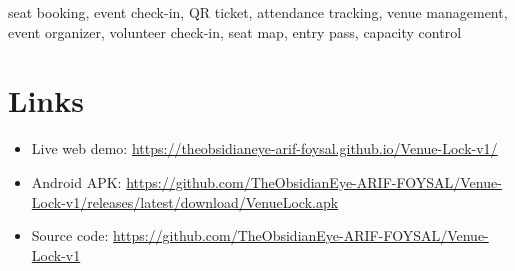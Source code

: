 \documentclass[11pt,a4paper]{article}
\begin{document}
seat booking, event check-in, QR ticket, attendance tracking, venue
management, event organizer, volunteer check-in, seat map, entry pass,
capacity control

\section{Links}

\begin{itemize}[leftmargin=1.5em]
    \item Live web demo:
        \url{https://theobsidianeye-arif-foysal.github.io/Venue-Lock-v1/}
    \item Android APK:
        \url{https://github.com/TheObsidianEye-ARIF-FOYSAL/Venue-Lock-v1/releases/latest/download/VenueLock.apk}
    \item Source code:
        \url{https://github.com/TheObsidianEye-ARIF-FOYSAL/Venue-Lock-v1}
\end{itemize}
\end{document}

